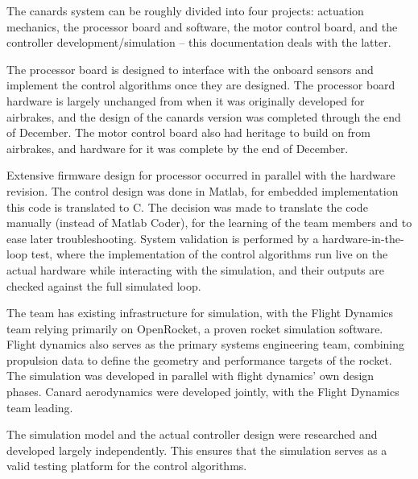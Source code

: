The canards system can be roughly divided into four projects: actuation mechanics, the processor board and software, the motor control board, and the controller development/simulation -- this documentation deals with the latter.

The processor board is designed to interface with the onboard sensors and implement the control algorithms once they are designed.
The processor board hardware is largely unchanged from when it was originally developed for airbrakes, and the design of the canards version was completed through the end of December. The motor control board also had heritage to build on from airbrakes, and hardware for it was complete by the end of December.

Extensive firmware design for processor occurred in parallel with the hardware revision. 
The control design was done in Matlab, for embedded implementation this code is translated to C.
The decision was made to translate the code manually (instead of Matlab Coder), for the learning of the team members and to ease later troubleshooting.
System validation is performed by a hardware-in-the-loop test, where the implementation of the control algorithms run live on the actual hardware while interacting with the simulation, and their outputs are checked against the full simulated loop.

The team has existing infrastructure for simulation, with the Flight Dynamics team relying primarily on OpenRocket, a proven rocket simulation software. 
Flight dynamics also serves as the primary systems engineering team, combining propulsion data to define the geometry and performance targets of the rocket. 
The simulation was developed in parallel with flight dynamics' own design phases.
Canard aerodynamics were developed jointly, with the   Flight Dynamics team leading.

The simulation model and the actual controller design were researched and developed largely independently.
This ensures that the simulation serves as a valid testing platform for the control algorithms.

